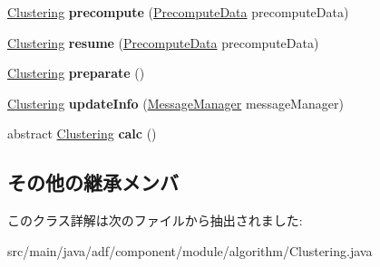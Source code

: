 \begin{DoxyCompactItemize}
\hypertarget{classadf_1_1component_1_1module_1_1algorithm_1_1Clustering_aa7924939f7d3f73322619ba5d60f2ea1}{}\label{classadf_1_1component_1_1module_1_1algorithm_1_1Clustering_aa7924939f7d3f73322619ba5d60f2ea1} 
\hyperlink{classadf_1_1component_1_1module_1_1algorithm_1_1Clustering}{Clustering} {\bfseries precompute} (\hyperlink{classadf_1_1agent_1_1precompute_1_1PrecomputeData}{Precompute\+Data} precompute\+Data)
\item 
\hypertarget{classadf_1_1component_1_1module_1_1algorithm_1_1Clustering_ab3e78f078f6b73a8581dab6fb64a13ad}{}\label{classadf_1_1component_1_1module_1_1algorithm_1_1Clustering_ab3e78f078f6b73a8581dab6fb64a13ad} 
\hyperlink{classadf_1_1component_1_1module_1_1algorithm_1_1Clustering}{Clustering} {\bfseries resume} (\hyperlink{classadf_1_1agent_1_1precompute_1_1PrecomputeData}{Precompute\+Data} precompute\+Data)
\item 
\hypertarget{classadf_1_1component_1_1module_1_1algorithm_1_1Clustering_a7d4daee07eecc0fb80f9dcc070dbfd42}{}\label{classadf_1_1component_1_1module_1_1algorithm_1_1Clustering_a7d4daee07eecc0fb80f9dcc070dbfd42} 
\hyperlink{classadf_1_1component_1_1module_1_1algorithm_1_1Clustering}{Clustering} {\bfseries preparate} ()
\item 
\hypertarget{classadf_1_1component_1_1module_1_1algorithm_1_1Clustering_a9518f4cfcc587897cf05170f399d1a7c}{}\label{classadf_1_1component_1_1module_1_1algorithm_1_1Clustering_a9518f4cfcc587897cf05170f399d1a7c} 
\hyperlink{classadf_1_1component_1_1module_1_1algorithm_1_1Clustering}{Clustering} {\bfseries update\+Info} (\hyperlink{classadf_1_1agent_1_1communication_1_1MessageManager}{Message\+Manager} message\+Manager)
\item 
\hypertarget{classadf_1_1component_1_1module_1_1algorithm_1_1Clustering_ab0323479531d10738a0cf25a3b5d3117}{}\label{classadf_1_1component_1_1module_1_1algorithm_1_1Clustering_ab0323479531d10738a0cf25a3b5d3117} 
abstract \hyperlink{classadf_1_1component_1_1module_1_1algorithm_1_1Clustering}{Clustering} {\bfseries calc} ()
\end{DoxyCompactItemize}
\subsection*{その他の継承メンバ}


このクラス詳解は次のファイルから抽出されました\+:\begin{DoxyCompactItemize}
\item 
src/main/java/adf/component/module/algorithm/Clustering.\+java\end{DoxyCompactItemize}
